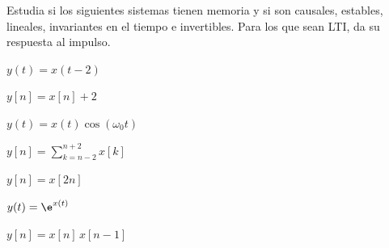 \documentclass[11pt,a4paper]{scrartcl}
\begin{document}
\begin{ejercicio}
  Estudia si los siguientes sistemas tienen memoria y si son causales, estables, lineales, invariantes en el tiempo e invertibles. Para los que sean LTI, da su respuesta al impulso.
  \begin{incisos}[3]
    \item $y(t)=x(t-2)$
    \item $y[n]=x[n]+2$
    \item $y(t)=x(t)\cos(\omega_0t)$
    \item $y[n]=\sum_{k=n-2}^{n+2}x[k]$
    \item $y[n]=x[2n]$
    \item $y(t)=\e^{x(t)}$
    \item $y[n]=x[n]\,x[n-1]$
  \end{incisos}
\end{ejercicio}
\end{document}
